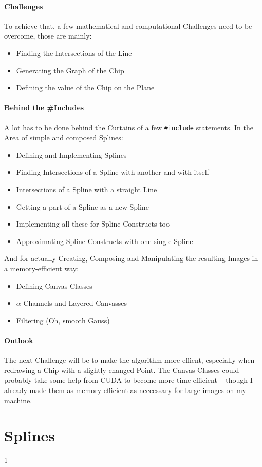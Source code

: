 \documentclass[10pt]{article}
\newcommand\behindIncludes{1}
\begin{document}
\paragraph{Challenges}
    To achieve that, a few mathematical and computational Challenges need to be overcome, those are mainly:
    \begin{itemize}
        \item Finding the Intersections of the Line
        \item Generating the Graph of the Chip
        \item Defining the value of the Chip on the Plane
    \end{itemize}
\paragraph{Behind the \#Includes}
    A lot has to be done behind the Curtains of a few {\tt \#include} statements.
    In the Area of simple and composed Splines:
    \begin{itemize}
        \item Defining and Implementing Splines
        \item Finding Intersections of a Spline with another and with itself
        \item Intersections of a Spline with a straight Line
        \item Getting a part of a Spline as a new Spline
        \item Implementing all these for Spline Constructs too
        \item Approximating Spline Constructs with one single Spline
    \end{itemize}
    And for actually Creating, Composing and Manipulating the resulting Images in a memory-efficient way:
    \begin{itemize}
        \item Defining Canvas Classes
        \item $\alpha$-Channels and Layered Canvasses
        \item Filtering (Oh, smooth Gauss)
    \end{itemize}
\paragraph{Outlook}
    The next Challenge will be to make the algorithm more effient, especially when redrawing a Chip with a slightly changed Point.
    The Canvas Classes could probably take some help from CUDA to become more time efficient – though I already made them as memory efficient as neccessary for large images on my machine.
\section{Splines}
    
    \if\behindIncludes1
        
        \newpage
    \fi

\newpage


\end{document}
